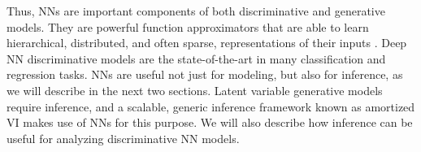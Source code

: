 Thus, NNs are important components of both discriminative and generative models. They are powerful function approximators that are able to learn hierarchical, distributed, and often sparse, representations of their inputs \citep{Bengio2009}. Deep NN discriminative models are the state-of-the-art in many classification and regression tasks. NNs are useful not just for modeling, but also for inference, as we will describe in the next two sections. Latent variable generative models require inference, and a scalable, generic inference framework known as amortized VI makes use of NNs for this purpose. We will also describe how inference can be useful for analyzing discriminative NN models.

